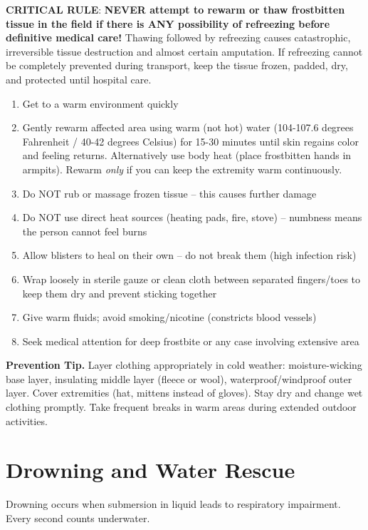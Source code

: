 \textbf{CRITICAL RULE}: \textbf{NEVER attempt to rewarm or thaw frostbitten tissue in the field if there is ANY possibility of refreezing before definitive medical care!} Thawing followed by refreezing causes catastrophic, irreversible tissue destruction and almost certain amputation. If refreezing cannot be completely prevented during transport, keep the tissue frozen, padded, dry, and protected until hospital care.

\begin{enumerate}[leftmargin=*]
\item Get to a warm environment quickly
\item Gently rewarm affected area using warm (not hot) water (104-107.6 degrees Fahrenheit / 40-42 degrees Celsius) for 15-30 minutes until skin regains color and feeling returns. Alternatively use body heat (place frostbitten hands in armpits). Rewarm \emph{only} if you can keep the extremity warm continuously.
\item Do NOT rub or massage frozen tissue -- this causes further damage
\item Do NOT use direct heat sources (heating pads, fire, stove) -- numbness means the person cannot feel burns
\item Allow blisters to heal on their own -- do not break them (high infection risk)
\item Wrap loosely in sterile gauze or clean cloth between separated fingers/toes to keep them dry and prevent sticking together
\item Give warm fluids; avoid smoking/nicotine (constricts blood vessels)
\item Seek medical attention for deep frostbite or any case involving extensive area
\end{enumerate}
\medskip\noindent\textbf{Prevention Tip.}
Layer clothing appropriately in cold weather: moisture-wicking base layer, insulating middle layer (fleece or wool), waterproof/windproof outer layer. Cover extremities (hat, mittens instead of gloves). Stay dry and change wet clothing promptly. Take frequent breaks in warm areas during extended outdoor activities.

\section{Drowning and Water Rescue}

Drowning occurs when submersion in liquid leads to respiratory impairment. Every second counts underwater.

